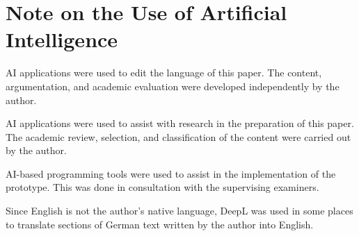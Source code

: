 \chapter*{Note on the Use of Artificial Intelligence}

AI applications were used to edit the language of this paper. The content, argumentation,
and academic evaluation were developed independently by the author.

AI applications were used to assist with research in the preparation of this paper. The
academic review, selection, and classification of the content were carried out by the author.

AI-based programming tools were used to assist in the implementation of the prototype. This
was done in consultation with the supervising examiners.

Since English is not the author’s native language, DeepL \cite{DeepLAIPlatform} was used in some places to
translate sections of German text written by the author into English.




